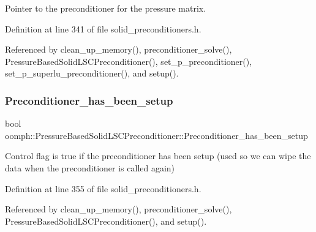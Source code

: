 Pointer to the \textquotesingle{}preconditioner\textquotesingle{} for the pressure matrix. 



Definition at line 341 of file solid\+\_\+preconditioners.\+h.



Referenced by clean\+\_\+up\+\_\+memory(), preconditioner\+\_\+solve(), Pressure\+Based\+Solid\+L\+S\+C\+Preconditioner(), set\+\_\+p\+\_\+preconditioner(), set\+\_\+p\+\_\+superlu\+\_\+preconditioner(), and setup().

\mbox{\label{classoomph_1_1PressureBasedSolidLSCPreconditioner_a36040d15eba392db2f29c503644a6ed2}} 
\subsubsection{\texorpdfstring{Preconditioner\+\_\+has\+\_\+been\+\_\+setup}{Preconditioner\_has\_been\_setup}}
{\footnotesize\ttfamily bool oomph\+::\+Pressure\+Based\+Solid\+L\+S\+C\+Preconditioner\+::\+Preconditioner\+\_\+has\+\_\+been\+\_\+setup\hspace{0.3cm}{\ttfamily [private]}}



Control flag is true if the preconditioner has been setup (used so we can wipe the data when the preconditioner is called again) 



Definition at line 355 of file solid\+\_\+preconditioners.\+h.



Referenced by clean\+\_\+up\+\_\+memory(), preconditioner\+\_\+solve(), Pressure\+Based\+Solid\+L\+S\+C\+Preconditioner(), and setup().

\mbox{\label{classoomph_1_1PressureBasedSolidLSCPreconditioner_a03338487e35713fc408e83b12f9ba8ac}} 
